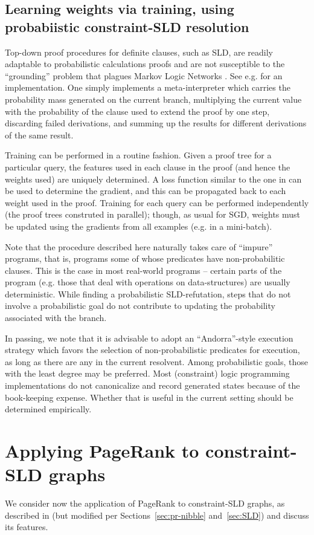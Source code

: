 \documentclass{article} %
\begin{document}
\subsection{Learning weights via training, using probabiistic constraint-SLD resolution}
Top-down proof procedures for definite clauses, such as SLD, are readily adaptable to probabilistic calculations proofs and are not susceptible to the ``grounding'' problem that plagues Markov Logic Networks \cite{domingos:srl07}. See e.g. \cite{Saraswat-2016-pcc} for an implementation. One simply implements a meta-interpreter which carries the probability mass generated on the current branch, multiplying the current value with the probability of the clause used to extend the proof by one step, discarding failed derivations, and summing up the results for different derivations of the same result. 

Training can be performed in a routine fashion. Given a proof tree for a particular query, the features used in each clause in the proof (and hence the weights used) are uniquely determined. A loss function similar to the one in \cite[Sec 3.3]{Cohen-2015} can be used to determine the gradient, and this can be propagated back to each weight used in the proof. Training for each query can be performed independently (the proof trees construted in parallel); though, as usual for SGD, weights must be updated using the gradients from all examples (e.g.{} in a mini-batch). 

Note that the procedure described here naturally takes care of ``impure'' programs, that is, programs some of whose predicates have non-probabilitic clauses. This is the case in most real-world programs -- certain parts of the program (e.g.{} those that deal with operations on data-structures) are usually deterministic. While finding a probabilistic SLD-refutation, steps that do not involve a probabilistic goal do not contribute to updating the probability associated with the branch. 

In passing, we note that it is advisable to adopt an ``Andorra''-style execution strategy which favors the selection of non-probabilistic predicates for execution, as long as there are any in the current resolvent. Among probabilistic goals, those with the least degree may be preferred. Most (constraint) logic programming implementations do not canonicalize and record generated states because of the book-keeping expense. Whether that is useful in the current setting should be determined empirically. 
\section{Applying PageRank to constraint-SLD graphs}
We consider now the application of PageRank to constraint-SLD graphs, as described in \cite{Cohen-2015} (but modified per Sections~\ref{sec:pr-nibble} and~\ref{sec:SLD}) and discuss its features. 
\end{document}
